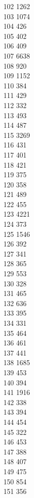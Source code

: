 { 102	1262 \\
 103	1074 \\
 104	426 \\
 105	402 \\
 106	409 \\
 107	6638 \\
 108	920 \\
 109	1152 \\
 110	384 \\
 111	429 \\
 112	332 \\
 113	493 \\
 114	487 \\
 115	3269 \\
 116	431 \\
 117	401 \\
 118	421 \\
 119	375 \\
 120	358 \\
 121	489 \\
 122	455 \\
 123	4221 \\
 124	373 \\
 125	1546 \\
 126	392 \\
 127	341 \\
 128	365 \\
 129	553 \\
 130	328 \\
 131	465 \\
 132	636 \\
 133	395 \\
 134	331 \\
 135	464 \\
 136	461 \\
 137	441 \\
 138	1685 \\
 139	453 \\
 140	394 \\
 141	1916 \\
 142	338 \\
 143	394 \\
 144	454 \\
 145	322 \\
 146	453 \\
 147	388 \\
 148	407 \\
 149	475 \\
 150	854 \\
 151	356 \\
}
